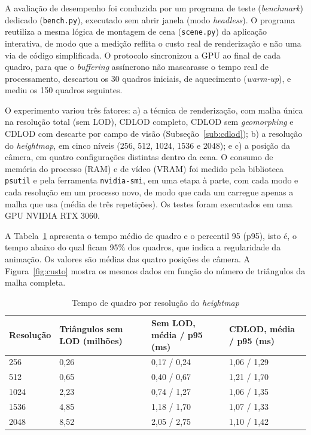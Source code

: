 \documentclass[conference]{IEEEtran}
\newcommand{\fonte}[1]{\par\vspace{2pt}{\footnotesize Fonte: #1\par}}
\begin{document}
A avaliação de desempenho foi conduzida por um programa de teste
(\emph{benchmark}) dedicado (\texttt{bench.py}), executado sem abrir janela
(modo \emph{headless}). O programa reutiliza a mesma lógica de montagem de
cena (\texttt{scene.py}) da aplicação interativa, de modo que a medição
reflita o custo real de renderização e não uma via de código simplificada.
O protocolo sincronizou a GPU ao final de cada quadro, para que o
\emph{buffering} assíncrono não mascarasse o tempo real de processamento,
descartou os 30 quadros iniciais, de aquecimento (\emph{warm-up}), e mediu
os 150 quadros seguintes.

O experimento variou três fatores: a) a técnica de renderização, com malha única na resolução total (sem LOD), CDLOD completo, CDLOD sem \emph{geomorphing} e CDLOD com descarte por campo de visão (Subseção~\ref{sub:cdlod}); b) a resolução do
\emph{heightmap}, em cinco níveis (256, 512, 1024, 1536 e 2048); e c) a
posição da câmera, em quatro configurações distintas dentro da cena. O consumo de memória do processo (RAM) e de vídeo (VRAM) foi medido pela biblioteca \texttt{psutil} e pela ferramenta \texttt{nvidia-smi}, em uma etapa à parte, com cada modo e cada resolução em um processo novo, de modo que cada um carregue apenas a malha que usa (média de três repetições). Os testes foram executados em uma GPU NVIDIA RTX 3060.

A Tabela~\ref{tab:tempos} apresenta o tempo médio de quadro e o percentil
95 (p95), isto é, o tempo abaixo do qual ficam 95\% dos quadros, que indica
a regularidade da animação. Os valores são médias das quatro posições de
câmera. A Figura~\ref{fig:custo} mostra os mesmos dados em função do número
de triângulos da malha completa.

\begin{table}[t]
\caption{Tempo de quadro por resolução do \emph{heightmap}}
\label{tab:tempos}
\centering
\begin{tabular}{@{}p{1.5cm}p{1.7cm}p{2.0cm}p{2.0cm}@{}}
\toprule
\textbf{Resolução} & \textbf{Triângulos sem LOD (milhões)} & \textbf{Sem LOD, média / p95 (ms)} & \textbf{CDLOD, média / p95 (ms)} \\
\midrule
256  & 0,26 & 0,17 / 0,24 & 1,06 / 1,29 \\
512  & 0,65 & 0,40 / 0,67 & 1,21 / 1,70 \\
1024 & 2,23 & 0,74 / 1,27 & 1,06 / 1,35 \\
1536 & 4,85 & 1,18 / 1,70 & 1,07 / 1,33 \\
2048 & 8,52 & 2,05 / 2,75 & 1,10 / 1,42 \\
\bottomrule
\end{tabular}
\fonte{Elaborado pelos autores (2026), com dados do teste de desempenho. Os
triângulos incluem a água. O CDLOD desenha cerca de 0,43 milhão de
triângulos por quadro em todas as resoluções.}
\end{table}
\end{document}
